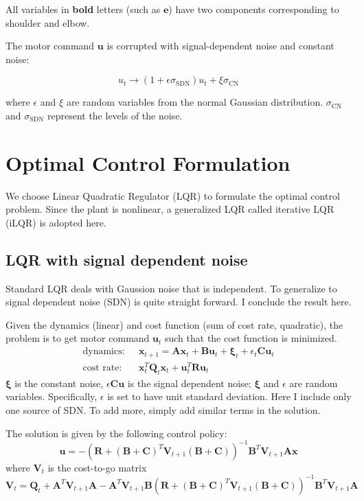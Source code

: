 All variables in \textbf{bold} letters (such as $\bm{e}$) have two components corresponding to shoulder and elbow.

The motor command $\bm{u}$ is corrupted with signal-dependent noise and constant noise:

\begin{equation}
u_t \rightarrow (1 + \epsilon\sigma_{\text{SDN}}) u_t + \xi\sigma_{\text{CN}}
\end{equation}

where $\epsilon$ and $\xi$ are random variables from the normal Gaussian distribution.
$\sigma_{\text{CN}}$ and $\sigma_{\text{SDN}}$ represent the levels of the noise.

\section{Optimal Control Formulation}\label{ocformulation}
We choose Linear Quadratic Regulator (LQR) \cite{todorov2006optimal} to formulate the optimal control problem. Since the plant is nonlinear, a generalized LQR called iterative LQR (iLQR) is adopted here.

\subsection{LQR with signal dependent noise}
Standard LQR deals with Gaussion noise that is independent. To generalize to signal dependent noise (SDN) is quite straight forward. I conclude the result here.

Given the dynamics (linear) and cost function (sum of cost rate, quadratic), the problem is to get motor command $\bm{u}_t$ such that the cost function is minimized.
\begin{equation}\label{optimprob}
	\begin{split}
	\text{dynamics:~~} & \bm{x}_{t+1} = \bm{Ax}_t + \bm{Bu}_t + \bm{\xi}_t + \epsilon_t\bm{Cu}_t \\
	\text{cost rate:~~} & \bm{x}_t^T\bm{Q}_t\bm{x}_t + \bm{u}_t^T\bm{Ru}_t
	\end{split}
\end{equation}
$\bm{\xi}$ is the constant noise, $\epsilon\bm{Cu}$ is the signal dependent noise; $\bm{\xi}$ and $\epsilon$ are random variables. Specifically, $\epsilon$ is set to have unit standard deviation. Here I include only one source of SDN. To add more, simply add similar terms in the solution.

The solution is given by the following control policy:
\begin{equation}
	\bm{u} = -(\bm{R}+(\bm{B+C})^T\bm{V}_{t+1}(\bm{B+C}) )^{-1} \bm{B}^T\bm{V}_{t+1}\bm{Ax}
\end{equation}
where $\bm{V}_t$ is the cost-to-go matrix 
\begin{equation}
	\bm{V}_t = \bm{Q}_t + \bm{A}^T\bm{V}_{t+1}\bm{A} - \bm{A}^T\bm{V}_{t+1}\bm{B}(\bm{R} + (\bm{B+C})^T\bm{V}_{t+1}(\bm{B+C}))^{-1}\bm{B}^T\bm{V}_{t+1}\bm{A}
\end{equation}

